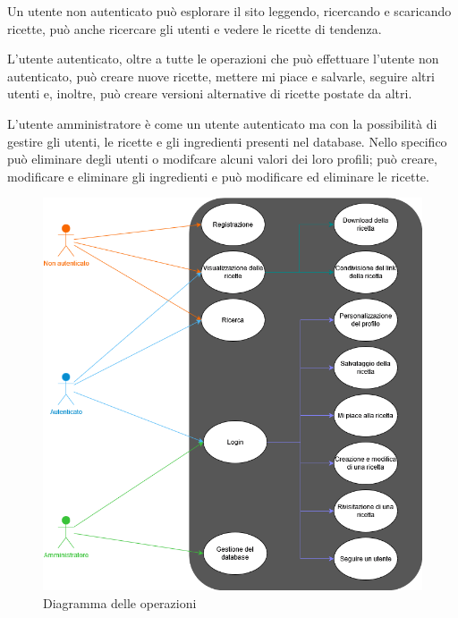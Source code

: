 \documentclass[a4paper]{article}
\begin{document}
            Un utente non autenticato può esplorare il sito leggendo, ricercando e scaricando ricette, 
            può anche ricercare gli utenti e vedere le ricette di tendenza.
            
            L'utente autenticato, oltre a tutte le operazioni che può effettuare l'utente non autenticato,
            può creare nuove ricette, mettere mi piace e salvarle, seguire altri utenti e, inoltre, può         
            creare versioni alternative di ricette postate da altri.
            
            L'utente amministratore è come un utente autenticato ma con la possibilità di gestire gli utenti, 
            le ricette e gli ingredienti presenti nel database.
            Nello specifico può eliminare degli utenti o modifcare alcuni valori dei loro profili; 
            può creare, modificare e eliminare gli ingredienti e può modificare ed eliminare le ricette.
            
            \begin{figure}[ht]
                \centering
                \includegraphics[width=1\textwidth]{./pictures/diagramma_operazioni.png}
                \caption{Diagramma delle operazioni}
                \label{fig:diagramma_operazioni}
            \end{figure}
    
\end{document}

